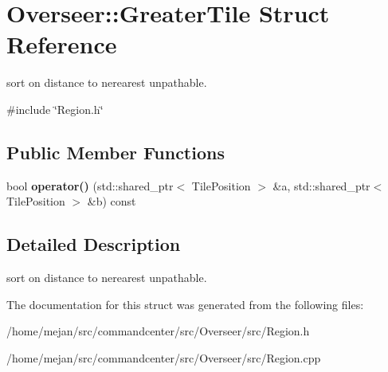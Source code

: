 \hypertarget{structOverseer_1_1GreaterTile}{}\section{Overseer\+:\+:Greater\+Tile Struct Reference}
\label{structOverseer_1_1GreaterTile}


sort on distance to nerearest unpathable.  




{\ttfamily \#include \char`\"{}Region.\+h\char`\"{}}

\subsection*{Public Member Functions}
\begin{DoxyCompactItemize}
\item 
bool {\bfseries operator()} (std\+::shared\+\_\+ptr$<$ Tile\+Position $>$ \&a, std\+::shared\+\_\+ptr$<$ Tile\+Position $>$ \&b) const \hypertarget{structOverseer_1_1GreaterTile_a7df65c34af87144d96c17ffbedc5510d}{}\label{structOverseer_1_1GreaterTile_a7df65c34af87144d96c17ffbedc5510d}

\end{DoxyCompactItemize}


\subsection{Detailed Description}
sort on distance to nerearest unpathable. 

The documentation for this struct was generated from the following files\+:\begin{DoxyCompactItemize}
\item 
/home/mejan/src/commandcenter/src/\+Overseer/src/Region.\+h\item 
/home/mejan/src/commandcenter/src/\+Overseer/src/Region.\+cpp\end{DoxyCompactItemize}
